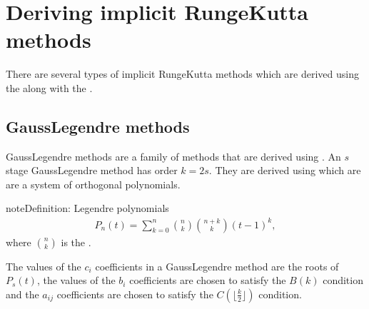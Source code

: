 \documentclass[letterpaper,10pt,english]{jupyterBook}
\begin{document}
\sphinxstepscope


\section{Deriving implicit Runge\sphinxhyphen{}Kutta methods}
\label{\detokenize{3_IRKs/3.1_Deriving_IRK_methods:deriving-implicit-runge-kutta-methods}}\label{\detokenize{3_IRKs/3.1_Deriving_IRK_methods:deriving-irk-methods-section}}\label{\detokenize{3_IRKs/3.1_Deriving_IRK_methods::doc}}
\sphinxAtStartPar
There are several types of implicit Runge\sphinxhyphen{}Kutta methods which are derived using the {\hyperref[\detokenize{3_IRKs/3.0_IRKs:bk-ck-dk-order-conditions}]{}} along with the {\hyperref[\detokenize{2_ERKs/2.2_RK4_Derivation:row-sum-condition}]{}}.


\subsection{Gauss\sphinxhyphen{}Legendre methods}
\label{\detokenize{3_IRKs/3.1_Deriving_IRK_methods:gauss-legendre-methods}}\label{\detokenize{3_IRKs/3.1_Deriving_IRK_methods:gauss-legendre-derivation}}
\sphinxAtStartPar
Gauss\sphinxhyphen{}Legendre methods are a family of methods that are derived using . An \(s\)\sphinxhyphen{}stage Gauss\sphinxhyphen{}Legendre method has order \(k=2s\). They are derived using  which are are a system of orthogonal polynomials.

\begin{sphinxadmonition}{note}{Definition: Legendre polynomials}
\label{equation:3_IRKs/3.1_Deriving_IRK_methods:fde7546e-5b9c-4551-b0c5-d078374f13df}\begin{align}
   P_n (t)=\sum_{k=0}^n \binom{n}{k}\binom{n+k}{k}(t-1)^k,
\end{align}
\sphinxAtStartPar
where \(\displaystyle\binom{n}{k}\) is the .
\end{sphinxadmonition}

\sphinxAtStartPar
The values of the \(c_i\) coefficients in a Gauss\sphinxhyphen{}Legendre method are the roots of \(P_s(t)\), the values of the \(b_i\) coefficients are chosen to satisfy the \(B(k)\) condition and the \(a_{ij}\) coefficients are chosen to satisfy the \(C(\lfloor \frac{k}{2} \rfloor)\) condition.
\end{document}
